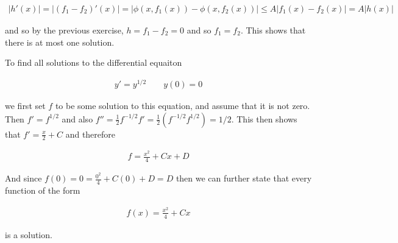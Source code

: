 \documentclass{article}
\begin{document}
  \begin{align*}
    |h'(x)| = |(f_1-f_2)'(x)| = |\phi(x,f_1(x))-\phi(x,f_2(x))| \leq A|f_1(x)-f_2(x)| = A|h(x)|
  \end{align*}

  and so by the previous exercise, $h=f_1-f_2=0$ and so $f_1=f_2$.  This shows that there is at most one solution.

  \vspace{1cm}

  To find all solutions to the differential equaiton

  \begin{align*}
    y'=y^{1/2}\qquad y(0)=0
  \end{align*}

  we first set $f$ to be some solution to this equation, and assume that it is not zero.  Then $f' = f^{1/2}$ and also $f'' = \frac{1}{2}f^{-1/2}f'=\frac 1 2 (f^{-1/2}f^{1/2})=1/2$.  This then shows that $f' = \frac x 2 + C$ and therefore

  \begin{align*}
    f = \frac{x^2}{4}+Cx+D
  \end{align*}

  And since $f(0)=0=\frac{0^2}{4}+C(0)+D = D$ then we can further state that every function of the form

  \begin{align*}
    f(x) = \frac{x^2}{4}+Cx
  \end{align*}

  is a solution.

  \pagebreak
\end{document}
